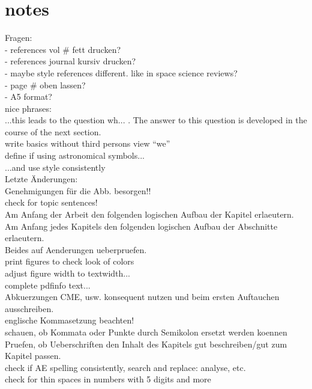 \section*{notes}

% 

Fragen:\\
	- references vol \# fett drucken?\\
	- references journal kursiv drucken?\\
		- maybe style references different. like in space science reviews?\\
	- page \# oben lassen?\\
	- A5 format?\\

nice phrases:\\
	...this leads to the question wh... . The answer to this question is developed in the course of the next section.\\
	
write basics without third persons view ``we''\\

define if using astronomical symbols...\\
...and use style consistently\\

Letzte Änderungen:\\
	Genehmigungen für die Abb. besorgen!!\\
	check for topic sentences!\\
	Am Anfang der Arbeit den folgenden logischen Aufbau der Kapitel erlaeutern.\\
	Am Anfang jedes Kapitels den folgenden logischen Aufbau der Abschnitte erlaeutern.\\
	Beides auf Aenderungen ueberpruefen.\\
	print figures to check look of colors\\
	adjust figure width to textwidth...\\
	complete pdfinfo text...\\

	Abkuerzungen CME, usw. konsequent nutzen und beim ersten Auftauchen ausschreiben.\\

	englische Kommasetzung beachten!\\
	schauen, ob Kommata oder Punkte durch Semikolon ersetzt werden koennen\\
	Pruefen, ob Ueberschriften den Inhalt des Kapitels gut beschreiben/gut zum Kapitel passen.\\
	check if AE spelling consistently, search and replace: analyse, etc.\\
	check for thin spaces in numbers with 5 digits and more\\
	
